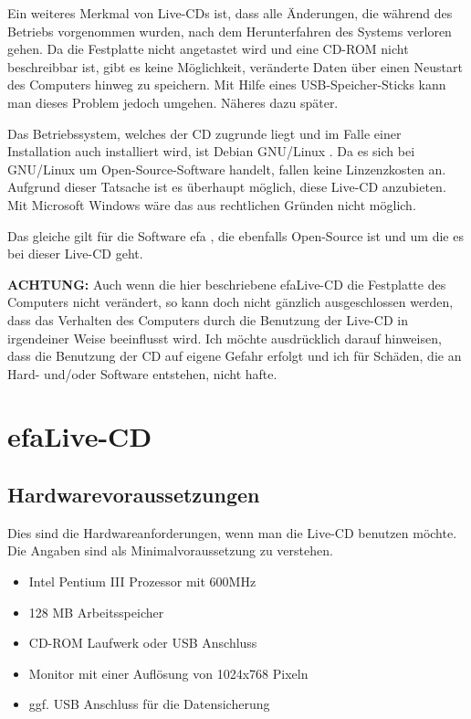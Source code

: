\documentclass[a4paper,12pt,twoside]{article}
\begin{document}
Ein weiteres Merkmal von Live-CDs ist, dass alle Änderungen, die während
des Betriebs vorgenommen wurden, nach dem Herunterfahren des Systems
verloren gehen. Da die Festplatte nicht angetastet wird und eine CD-ROM
nicht beschreibbar ist, gibt es keine Möglichkeit, veränderte Daten
über einen Neustart des Computers hinweg zu speichern. Mit Hilfe eines
USB-Speicher-Sticks kann man dieses Problem jedoch umgehen. Näheres
dazu später.

Das Betriebssystem, welches der CD zugrunde liegt und im Falle einer
Installation auch installiert wird, ist Debian GNU/Linux \cite{DEB1}.
Da es sich bei GNU/Linux um Open-Source-Software handelt, fallen keine
Linzenzkosten an. Aufgrund dieser Tatsache ist es überhaupt möglich,
diese Live-CD anzubieten. Mit Microsoft Windows wäre das aus
rechtlichen Gründen nicht möglich.

Das gleiche gilt für die Software efa \cite{EFA1}, die ebenfalls
Open-Source ist und um die es bei dieser Live-CD geht.

\bigskip
\textbf{ACHTUNG:} Auch wenn die hier beschriebene efaLive-CD die Festplatte des
Computers nicht verändert, so kann doch nicht gänzlich ausgeschlossen
werden, dass das Verhalten des Computers durch die Benutzung der
Live-CD in irgendeiner Weise beeinflusst wird. Ich möchte ausdrücklich
darauf hinweisen, dass die Benutzung der CD auf eigene Gefahr erfolgt
und ich für Schäden, die an Hard- und/oder Software entstehen, nicht
hafte.
\bigskip

\section{efaLive-CD}
\label{sct:efalivecd}
\subsection{Hardwarevoraussetzungen}
\label{sct:live_hardware}
Dies sind die Hardwareanforderungen, wenn man die Live-CD benutzen
möchte. Die Angaben sind als Minimalvoraussetzung zu verstehen.

\begin{itemize}
    \item Intel Pentium III Prozessor mit 600MHz
    \item 128 MB Arbeitsspeicher
    \item CD-ROM Laufwerk oder USB Anschluss
    \item Monitor mit einer Auflösung von 1024x768 Pixeln
    \item ggf. USB Anschluss für die Datensicherung
\end{itemize}
\end{document}

